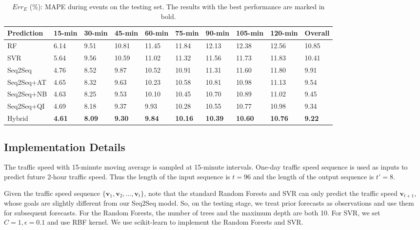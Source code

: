 \begin{table*}
\caption{$Err_E$ (\%): MAPE during events on the testing set. The results with the best performance are marked in bold.}
\label{tab:cmpevent}
\begin{tabular}{llllllllll}
\toprule
Prediction & 15-min & 30-min & 45-min & 60-min & 75-min & 90-min & 105-min & 120-min & Overall\\
\midrule
RF & 6.14 & 9.51 & 10.81 & 11.45 & 11.84 & 12.13 & 12.38 & 12.56 & 10.85 \\
SVR & 5.64 & 9.56 & 10.59 & 11.02 & 11.32 & 11.56 & 11.73 & 11.83 & 10.41 \\
\midrule
Seq2Seq         & 4.76 & 8.52 & 9.87 & 10.52 & 10.91 & 11.31 & 11.60 & 11.80 & 9.91\\
Seq2Seq+AT    & 4.65 & 8.32 & 9.63 & 10.23 & 10.58 & 10.81 & 10.98 & 11.13 & 9.54\\
Seq2Seq+NB & 4.63 & 8.25 & 9.53 & 10.10 & 10.45 & 10.70 & 10.89 & 11.02 & 9.45\\
\midrule
Seq2Seq+QI   & 4.69 & 8.18 & 9.37 & 9.93  & 10.28 & 10.55 & 10.77 & 10.98 & 9.34\\
Hybrid & \textbf{4.61} & \textbf{8.09} &\textbf{ 9.30} & \textbf{9.84} & \textbf{10.16} & \textbf{10.39} & \textbf{10.60} & \textbf{10.76} & \textbf{9.22}\\
\bottomrule
\end{tabular}
\end{table*}

\subsection{Implementation Details}
\label{details}

The traffic speed with 15-minute moving average is sampled at 15-minute intervals. One-day traffic speed sequence is used as inputs to predict future 2-hour traffic speed. Thus the length of the input sequence is $t=96$ and the length of the output sequence is $t'=8$.

Given the traffic speed sequence $\{\bm{v}_{1}, \bm{v}_{2}, \dots, \bm{v}_{t}\}$, note that the standard Random Forests and SVR can only predict the traffic speed $\bm{v}_{t+1}$, whose goals are slightly different from our Seq2Seq model. So, on the testing stage, we treat prior forecasts as observations and use them for subsequent forecasts. For the Random Forests, the number of trees and the maximum depth are both 10. For SVR, we set $C=1, \epsilon=0.1$ and use RBF kernel.  We use scikit-learn \cite{pedregosa2011scikit} to implement the Random Forests and SVR. 

